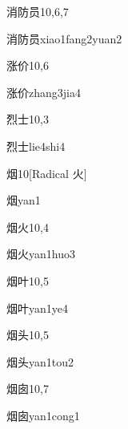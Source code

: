 \begin{entry}{消防员}{10,6,7}
  \begin{phonetics}{消防员}{xiao1fang2yuan2}
  \end{phonetics}
\end{entry}

\begin{entry}{涨价}{10,6}
  \begin{phonetics}{涨价}{zhang3jia4}
  \end{phonetics}
\end{entry}

\begin{entry}{烈士}{10,3}
  \begin{phonetics}{烈士}{lie4shi4}
  \end{phonetics}
\end{entry}

\begin{entry}{烟}{10}[Radical 火]
  \begin{phonetics}{烟}{yan1}
  \end{phonetics}
\end{entry}

\begin{entry}{烟火}{10,4}
  \begin{phonetics}{烟火}{yan1huo3}
  \end{phonetics}
\end{entry}

\begin{entry}{烟叶}{10,5}
  \begin{phonetics}{烟叶}{yan1ye4}
  \end{phonetics}
\end{entry}

\begin{entry}{烟头}{10,5}
  \begin{phonetics}{烟头}{yan1tou2}
  \end{phonetics}
\end{entry}

\begin{entry}{烟囱}{10,7}
  \begin{phonetics}{烟囱}{yan1cong1}
  \end{phonetics}
\end{entry}

